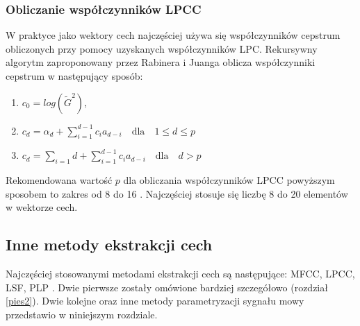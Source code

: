 \subsubsection{Obliczanie współczynników LPCC}
W praktyce \cite{fosr} jako wektory cech najczęściej używa się współczynników cepstrum obliczonych przy pomocy uzyskanych współczynników LPC. Rekursywny algorytm zaproponowany przez Rabinera i Juanga \cite{rabinerjuangfosr60} oblicza współczynniki cepstrum w następujący sposób:
\begin{enumerate}
    \centering
  \item $c_0 = log(\tilde{G}^2)$,
  \item $c_d = \alpha_d + \sum_{i=1}^{d-1} c_i a_{d-i} \quad \textrm{dla} \quad 1\leq d \leq p$
  \item $c_d = \sum_{i=1}d + \sum_{i=1}^{d-1} c_i a_{d-i} \quad \textrm{dla} \quad d > p$
\end{enumerate}

Rekomendowana wartość $p$ dla obliczania współczynników LPCC powyższym sposobem to zakres od 8 do 16 \cite{fosr}. Najczęściej stosuje się liczbę 8 do 20 elementów w wektorze cech. 
\label{pies2}
\subsection{Inne metody ekstrakcji cech}
Najczęściej stosowanymi metodami ekstrakcji cech są następujące: MFCC, LPCC, LSF, PLP \cite{overview}. Dwie pierwsze zostały omówione bardziej szczegółowo (rozdział \ref{pies2}). Dwie kolejne oraz inne metody parametryzacji sygnału mowy przedstawio w niniejszym rozdziale. 
